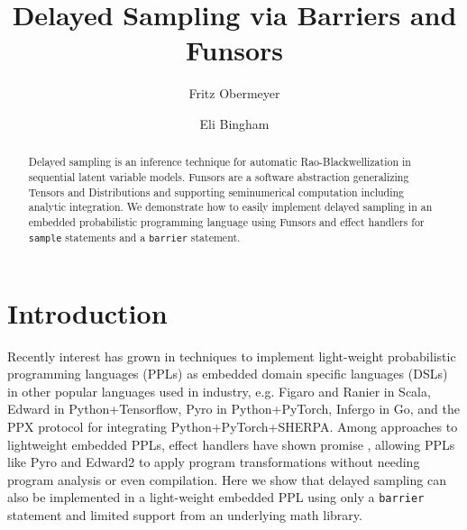 \documentclass[anonymous=false, %
               format=acmsmall, %
               review=true, %
               screen=true, %
               nonacm=true]{acmart}
\begin{document}
\title{Delayed Sampling via Barriers and Funsors}

\author{Fritz Obermeyer}

\author{Eli Bingham}

\begin{abstract}
Delayed sampling is an inference technique for automatic Rao-Blackwellization in sequential latent variable models.
Funsors are a software abstraction generalizing Tensors and Distributions and supporting seminumerical computation including analytic integration.
We demonstrate how to easily implement delayed sampling in an embedded probabilistic programming language using Funsors and effect handlers for \texttt{sample} statements and a \texttt{barrier} statement.
\end{abstract}

\maketitle

\section{Introduction}

Recently interest has grown in techniques to implement light-weight probabilistic programming languages (PPLs) as embedded domain specific languages (DSLs) in other popular languages used in industry, e.g. Figaro \cite{pfeffer2009figaro} and Ranier \cite{bryant2018ranier} in Scala, Edward \cite{tran2017deep} in Python+Tensorflow, Pyro \cite{bingham2018pyro} in Python+PyTorch, Infergo \cite{tolpin2019deployable} in Go, and the PPX protocol \cite{baydin2019efficient} for integrating Python+PyTorch+SHERPA.
Among approaches to lightweight embedded PPLs, effect handlers have shown promise \cite{moore2018effect,pretnar2015introduction}, allowing PPLs like Pyro and Edward2 \cite{tran2018simple} to apply program transformations without needing program analysis or even compilation.
Here we show that delayed sampling can also be implemented in a light-weight embedded PPL using only a \verb$barrier$ statement and limited support from an underlying math library.
\end{document}
